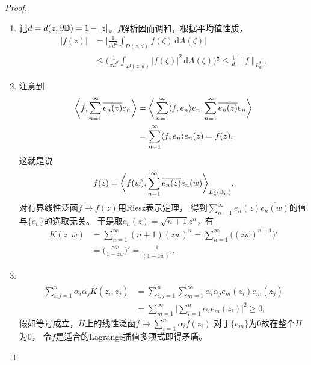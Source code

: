 \begin{proof}
    \begin{enumerate}[label=(\roman*)]
    \item 记$d=d(z,\partial\mathbb{D})=1-|z|$。$f$解析因而调和，根据平均值性质，
    \begin{align*}|f(z)|&=\bigg|\frac{1}{\pi d^2}\int_{D(z,d)} f(\zeta)\,\mathrm{d}A(\zeta)\bigg|\\
    &\leqslant\bigg(\frac{1}{\pi d^2}\int_{D(z,d)} |f(\zeta)|^2\,\mathrm{d}A(\zeta)\bigg)^\frac{1}{2}
    \leqslant\frac{1}{d}\|f\|_{L^2_a}.\end{align*}
    \item 注意到
    \begin{align*}
        \bigg\langle f,\sum_{n=1}^\infty \overline{e_n(z)}e_n \bigg\rangle
        &=\bigg\langle \sum_{n=1}^\infty\langle f,e_n\rangle e_n,\sum_{n=1}^\infty \overline{e_n(z)}e_n \bigg\rangle\\
        &=\sum_{n=1}^\infty\langle f,e_n\rangle e_n(z)=f(z),
    \end{align*}
    这就是说
    $$f(z)=\bigg\langle f(w),\sum_{n=1}^\infty \overline{e_n(z)}e_n(w) \bigg\rangle_{L_a^2(\mathbb{D}_w)}.$$
    对有界线性泛函$f \mapsto f(z)$用Riesz表示定理，
    得到$\sum\limits_{n=1}^\infty e_n(z)\overline{e_n(w)}$的值与$\{e_n\}$的选取无关。
    于是取$e_n(z)=\sqrt{n+1}z^n$，有
    \begin{align*}K(z,w)&=\sum_{n=1}^\infty (n+1)(z\bar{w})^n
    =\sum_{n=1}^\infty \big((z\bar{w})^{n+1}\big)'\\
    &=\bigg(\frac{z\bar{w}}{1-z\bar{w}}\bigg)'=\frac{1}{(1-z\bar{w})^2}.\end{align*}
    \item \\
    \begin{align*}
        \sum_{i,j=1}^n\alpha_i\overline{\alpha_j}K(z_i,z_j)
        &=\sum_{i,j=1}^n\sum_{m=1}^\infty\alpha_i\overline{\alpha_j}e_m(z_i)\overline{e_m(z_j)}\\
        &=\sum_{m=1}^\infty\bigg|\sum_{i=1}^n \alpha_ie_m(z_i)\bigg|^2\geqslant0,
    \end{align*}
    假如等号成立，$H$上的线性泛函$f\mapsto\sum\limits_{i=1}^n \alpha_if(z_i)$
    对于$\{e_m\}$为$0$故在整个$H$为$0$，
    令$f$是适合的Lagrange插值多项式即得矛盾。\qedhere
    \end{enumerate}
\end{proof}

